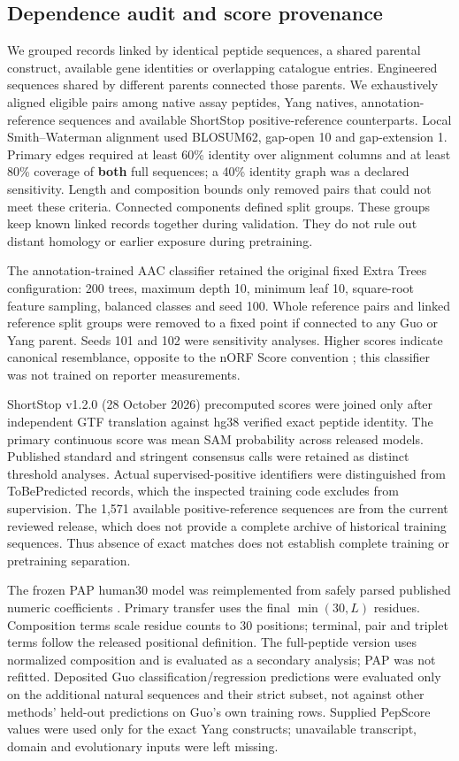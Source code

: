 \documentclass[11pt,a4paper]{article}
\begin{document}
\subsection{Dependence audit and score provenance}
We grouped records linked by identical peptide sequences, a shared parental construct, available gene identities or overlapping catalogue entries. Engineered sequences
shared by different parents connected those parents. We exhaustively aligned
eligible pairs among native assay peptides, Yang natives, annotation-reference
sequences and available ShortStop positive-reference counterparts. Local
Smith--Waterman alignment used BLOSUM62, gap-open 10 and gap-extension 1.
Primary edges required at least 60\% identity over alignment columns and at
least 80\% coverage of \textbf{both} full sequences; a 40\% identity graph was a
declared sensitivity. Length and composition bounds only removed pairs that
could not meet these criteria. Connected components defined split groups.
These groups keep known linked records together during validation. They do not rule out distant homology or earlier exposure during pretraining.

The annotation-trained AAC classifier retained the original fixed Extra Trees
configuration: 200 trees, maximum depth 10, minimum leaf 10, square-root
feature sampling, balanced classes and seed 100. Whole reference pairs and
linked reference split groups were removed to a fixed point if connected to
any Guo or Yang parent. Seeds 101 and 102 were sensitivity analyses. Higher
scores indicate canonical resemblance, opposite to the nORF Score convention \cite{gounder};
this classifier was not trained on reporter measurements.

ShortStop v1.2.0 (28 October 2026) precomputed scores were joined only after
independent GTF translation against hg38 verified exact peptide identity.
The primary continuous score was mean SAM probability across released models.
Published standard and stringent consensus calls were retained as distinct
threshold analyses. Actual supervised-positive identifiers were distinguished
from ToBePredicted records, which the inspected training code excludes from
supervision. The 1,571 available positive-reference sequences are from the current reviewed release, which does not provide a complete archive of historical training sequences. Thus absence
of exact matches does not establish complete training or pretraining separation.

The frozen PAP human30 model was reimplemented from safely parsed published
numeric coefficients \cite{voutsinos}. Primary transfer uses the final
$\min(30,L)$ residues. Composition terms scale residue counts to 30 positions;
terminal, pair and triplet terms follow the released positional definition.
The full-peptide version uses normalized composition and is evaluated as a secondary analysis; PAP was not refitted. Deposited Guo classification/regression predictions
were evaluated only on the additional natural sequences and their strict
subset, not against other methods' held-out predictions on Guo's own training
rows. Supplied PepScore values were used only for the exact Yang constructs;
unavailable transcript, domain and evolutionary inputs were left missing.
\end{document}
